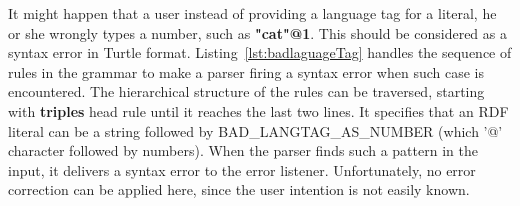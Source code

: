 \begin{enumerate}
It might happen that a user instead of providing a language tag for a literal, he or she wrongly types a number, such as \textbf{"cat"@1}.
This should be considered as a syntax error in Turtle format. 
Listing~\ref{lst:badlaguageTag} handles the sequence of rules in the grammar to make a parser firing a syntax error when such case is encountered. 
The hierarchical structure of the rules can be traversed, starting with \textbf{triples} head rule until it reaches the last two lines.
It specifies that an RDF literal can be a string followed by BAD\_LANGTAG\_AS\_NUMBER (which '@' character followed by numbers). 
When the parser finds such a pattern in the input, it delivers a syntax error to the error listener. 
Unfortunately, no error correction can be applied here, since the user intention is not easily known.  

\end{enumerate}
